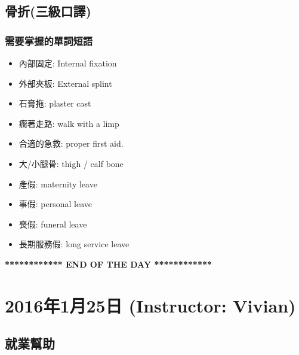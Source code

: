 \subsection{骨折(三級口譯)}
\subsubsection*{需要掌握的單詞短語}
\begin{multicols}{2}
\begin{itemize}
  \itemsep0em
  \item 內部固定: Internal fixation
  \item 外部夾板: External splint
  \item 石膏拖: plaster cast
  \item 瘸著走路: walk with a limp
  \item 合適的急救: proper first aid.
  \item 大/小腿骨: thigh / calf bone
  \item 產假: maternity leave
  \item 事假: personal leave
  \item 喪假: funeral leave
  \item 長期服務假: long service leave
\end{itemize}
\end{multicols}

\vspace{15mm}

\begin{center}
  \textbf{************ END OF THE DAY ************}
\end{center}
\newpage

\section{2016年1月25日 (Instructor: Vivian)}
\subsection{就業幫助}
